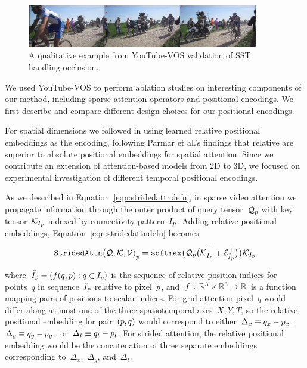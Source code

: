 \begin{figure}
\centering
\includegraphics[width=0.9\textwidth]{Figures/aina-occlusion}
\caption{A qualitative example from YouTube-VOS validation of SST handling
         occlusion.}
\label{fig:ainaocclusion}
\end{figure}

We used YouTube-VOS to perform ablation studies on interesting components of
our method, including sparse attention operators and positional encodings.
We first describe and compare different design choices for our positional
encodings.

For spatial dimensions we followed \citet{parmar2019standalone} in
using learned relative positional embeddings as the encoding, following Parmar
et al.'s findings that relative are superior to absolute positional embeddings
for spatial attention.
Since we contribute an extension of attention-based models from 2D to 3D, we
focused on experimental investigation of different temporal positional
encodings.

As we described in Equation~\ref{eqn:stridedattndefn}, in sparse video
attention we propagate information through the outer product of query
tensor~$\mathcal{Q}_p$ with key tensor~$\mathcal{K}_{I_p}$ indexed by
connectivity pattern~$I_p$.
Adding relative positional embeddings, Equation~\ref{eqn:stridedattndefn} becomes

\begin{equation}
        \mathtt{StridedAttn}{\big(\mathcal{Q}, \mathcal{K}, \mathcal{V})}_p{} = \mathtt{softmax}\big(\mathcal{Q}_p{} \big(\mathcal{K}^\top_{I_p} + \mathcal{E}^\top_{\tilde{I}_p}\big)\big)\mathcal{K}_{I_p}
\end{equation}

\noindent where~$\tilde{I}_p{} = (f(q, p) : q \in I_p)$
is the sequence of relative position indices for points~$q$ in
sequence~$I_p$ relative to pixel~$p$,
and~$f \,:\, \mathbb{R}^3\times \mathbb{R}^3 \rightarrow \mathbb{R}$ is a function mapping
pairs of positions to scalar indices.
For grid attention pixel~$q$ would differ along at most one of the
three spatiotemporal axes~$X, Y, T$, so the relative positional embedding for
pair~$(p, q)$ would correspond to
either~$\Delta_x \equiv q_x - p_x$,
$\Delta_y \equiv q_y - p_y$,~or~$\Delta_t \equiv q_t - p_t$.
For strided attention, the relative positional embedding would be the
concatenation of three separate embeddings corresponding
to~$\Delta_x$,~$\Delta_y$, and~$\Delta_t$.

